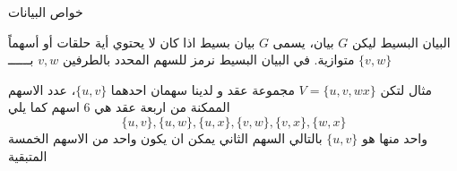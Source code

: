 \begin{frame}{خواص البيانات}
\begin{exampleblock}{البيان البسيط}
ليكن $G$ بيان، يسمى $G$ بيان بسيط اذا كان لا يحتوي أية حلقات أو أسهماً متوازية. في البيان البسيط نرمز للسهم المحدد بالطرفين $v,w$ بــــــ $\{v,w\}$
\end{exampleblock}

\pause
\begin{exampleblock}{مثال}
		لتكن $V=\{u,v,wx\}$ مجموعة عقد و لدينا سهمان احدهما $\{u,v\}$، عدد الاسهم الممكنة من اربعة عقد هي 6 اسهم كما يلي
	\[
	\{u,v\}, \{u,w\}, \{u,x\}, \{v,w\}, \{v,x\}, \{w,x\}
	\]
	واحد منها هو $\{u,v\}$ بالتالي السهم الثاني يمكن ان يكون واحد من الاسهم  الخمسة المتبقية
\end{exampleblock}
\end{frame}

